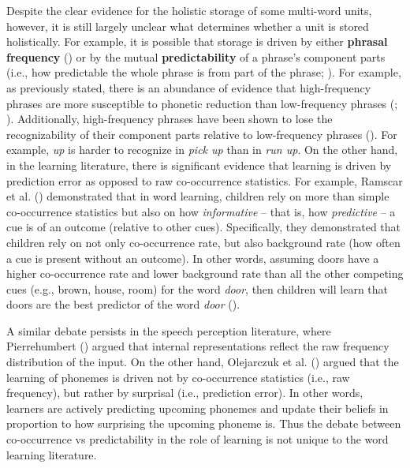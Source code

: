 \documentclass[
  12pt,
  letterpaper,
]{scrreprt}
\begin{document}
Despite the clear evidence for the holistic storage of some multi-word
units, however, it is still largely unclear what determines whether a
unit is stored holistically. For example, it is possible that storage is
driven by either \textbf{phrasal frequency}
() or by the mutual
\textbf{predictability} of a phrase's component parts (i.e., how
predictable the whole phrase is from part of the phrase;
).
For example, as previously stated, there is an abundance of evidence
that high-frequency phrases are more susceptible to phonetic reduction
than low-frequency phrases (;
).
Additionally, high-frequency phrases have been shown to lose the
recognizability of their component parts relative to low-frequency
phrases
(). For example, \emph{up} is harder to recognize in
\emph{pick up} than in \emph{run up}. On the other hand, in the learning
literature, there is significant evidence that learning is driven by
prediction error as opposed to raw co-occurrence statistics. For
example, Ramscar et al.
()
demonstrated that in word learning, children rely on more than simple
co-occurrence statistics but also on how \emph{informative} -- that is,
how \emph{predictive} -- a cue is of an outcome (relative to other
cues). Specifically, they demonstrated that children rely on not only
co-occurrence rate, but also background rate (how often a cue is present
without an outcome). In other words, assuming doors have a higher
co-occurrence rate and lower background rate than all the other
competing cues (e.g., brown, house, room) for the word \emph{door}, then
children will learn that doors are the best predictor of the word
\emph{door}
().

A similar debate persists in the speech perception literature, where
Pierrehumbert
() argued that
internal representations reflect the raw frequency distribution of the
input. On the other hand, Olejarczuk et al.
()
argued that the learning of phonemes is driven not by co-occurrence
statistics (i.e., raw frequency), but rather by surprisal (i.e.,
prediction error). In other words, learners are actively predicting
upcoming phonemes and update their beliefs in proportion to how
surprising the upcoming phoneme is. Thus the debate between
co-occurrence vs predictability in the role of learning is not unique to
the word learning literature.
\end{document}
